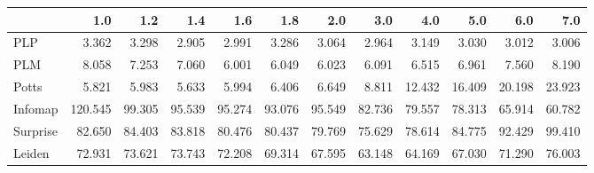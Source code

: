 \begin{tabular}{lrrrrrrrrrrr}
\toprule
{} &     1.0 &    1.2 &    1.4 &    1.6 &    1.8 &    2.0 &    3.0 &    4.0 &    5.0 &    6.0 &    7.0 \\
\midrule
PLP      &   3.362 &  3.298 &  2.905 &  2.991 &  3.286 &  3.064 &  2.964 &  3.149 &  3.030 &  3.012 &  3.006 \\
PLM      &   8.058 &  7.253 &  7.060 &  6.001 &  6.049 &  6.023 &  6.091 &  6.515 &  6.961 &  7.560 &  8.190 \\
Potts    &   5.821 &  5.983 &  5.633 &  5.994 &  6.406 &  6.649 &  8.811 & 12.432 & 16.409 & 20.198 & 23.923 \\
Infomap  & 120.545 & 99.305 & 95.539 & 95.274 & 93.076 & 95.549 & 82.736 & 79.557 & 78.313 & 65.914 & 60.782 \\
Surprise &  82.650 & 84.403 & 83.818 & 80.476 & 80.437 & 79.769 & 75.629 & 78.614 & 84.775 & 92.429 & 99.410 \\
Leiden   &  72.931 & 73.621 & 73.743 & 72.208 & 69.314 & 67.595 & 63.148 & 64.169 & 67.030 & 71.290 & 76.003 \\
\bottomrule
\end{tabular}
